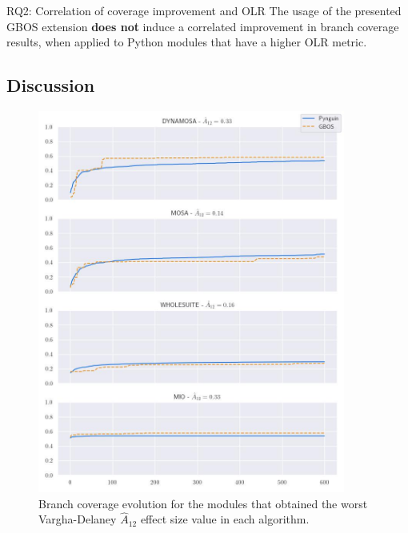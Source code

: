 \documentclass[%
  chapterprefix=false,%
  open=right,%
  twoside=true,%
  paper=a4,%
  logofile={Figures/logo.png},%
  thesistype=master,%
  UKenglish,%
]{se2thesis}
\begin{document}
\begin{summary}{RQ2: Correlation of coverage improvement and OLR}
  The usage of the presented GBOS extension \textbf{does not} induce a correlated improvement in branch coverage results, when applied to Python modules that have a higher OLR metric.
\end{summary}

\subsection*{Discussion}

\begin{figure}[ht]
  \centering
  \includegraphics[width=0.9\textwidth]{Figures/Results/worstA12.jpg}
  \caption{Branch coverage evolution for the modules that obtained the worst Vargha-Delaney \(\hat{A}_{12}\) effect size value in each algorithm.}\label{fig:worsta12}
\end{figure}
\end{document}

